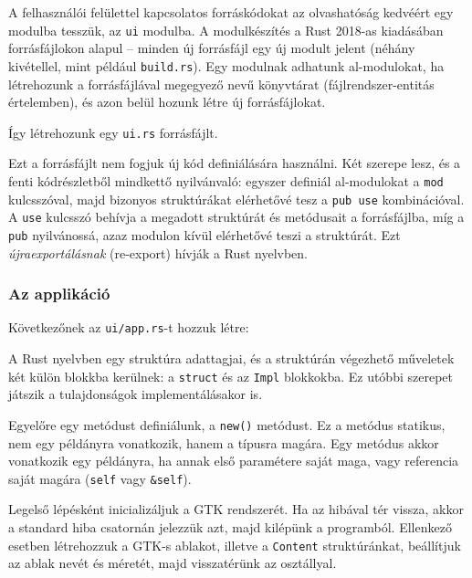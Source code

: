 A felhasználói felülettel kapcsolatos forráskódokat az olvashatóság kedvéért egy modulba tesszük,
az \texttt{ui} modulba.
A modulkészítés a Rust 2018-as kiadásában forrásfájlokon alapul -- 
minden új forrásfájl egy új modult jelent (néhány kivétellel, mint például \texttt{build.rs}).
Egy modulnak adhatunk al-modulokat, ha létrehozunk a forrásfájlával megegyező nevű könyvtárat (fájlrendszer-entitás értelemben),
és azon belül hozunk létre új forrásfájlokat.

Így létrehozunk egy \texttt{ui.rs} forrásfájlt.



Ezt a forrásfájlt nem fogjuk új kód definiálására használni.
Két szerepe lesz, és a fenti kódrészletből mindkettő nyilvánvaló: 
egyszer definiál al-modulokat a \texttt{mod} kulcsszóval,
majd bizonyos struktúrákat elérhetővé tesz a \texttt{pub use} kombinációval.
A \texttt{use} kulcsszó behívja a megadott struktúrát és metódusait a forrásfájlba,
míg a \texttt{pub} nyilvánossá, azaz modulon kívül elérhetővé teszi a struktúrát.
Ezt \textit{újraexportálásnak} (re-export) hívják a Rust nyelvben.

\subsubsection{Az applikáció}

Következőnek az \texttt{ui/app.rs}-t hozzuk létre:



A Rust nyelvben egy struktúra adattagjai, és a struktúrán végezhető műveletek két külön blokkba
kerülnek: a \texttt{struct} és az \texttt{Impl} blokkokba.
Ez utóbbi szerepet játszik a tulajdonságok implementálásakor is.

Egyelőre egy metódust definiálunk, a \texttt{new()} metódust.
Ez a metódus statikus, nem egy példányra vonatkozik, hanem a típusra magára.
Egy metódus akkor vonatkozik egy példányra, ha annak első paramétere saját maga, vagy referencia saját magára
(\texttt{self} vagy \verb+&self+).

Legelső lépésként inicializáljuk a GTK rendszerét.
Ha az hibával tér vissza, akkor a standard hiba csatornán jelezzük azt, majd kilépünk a programból.
Ellenkező esetben létrehozzuk a GTK-s ablakot, illetve a \texttt{Content} struktúránkat,
beállítjuk az ablak nevét és méretét, majd visszatérünk az osztállyal.

